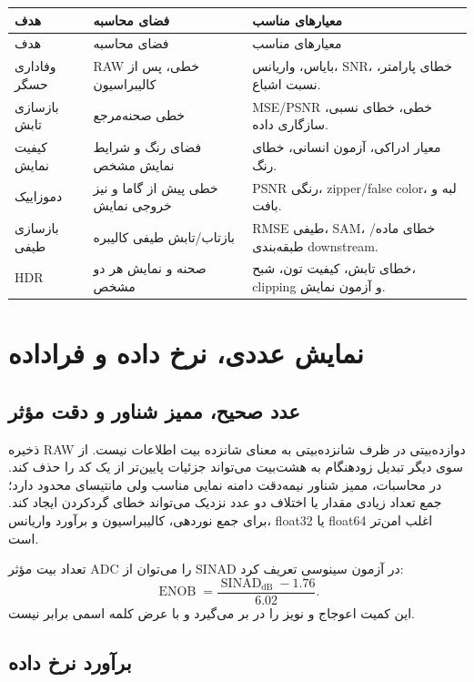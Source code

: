 \begin{longtable}{p{}p{}p{}}
\toprule
هدف & فضای محاسبه & معیارهای مناسب\\
\midrule
\endfirsthead
\toprule
هدف & فضای محاسبه & معیارهای مناسب\\
\midrule
\endhead
وفاداری حسگر & RAW خطی، پس از کالیبراسیون & بایاس، واریانس، SNR، خطای پارامتر، نسبت اشباع.\\
بازسازی تابش & خطی صحنه‌مرجع & MSE/PSNR خطی، خطای نسبی، سازگاری داده.\\
کیفیت نمایش & فضای رنگ و شرایط نمایش مشخص & معیار ادراکی، آزمون انسانی، خطای رنگ.\\
دموزاییک & خطی پیش از گاما و نیز خروجی نمایش & PSNR رنگی، zipper/false color، لبه و بافت.\\
بازسازی طیفی & بازتاب/تابش طیفی کالیبره & RMSE طیفی، SAM، خطای ماده/طبقه‌بندی downstream.\\
HDR & صحنه و نمایش هر دو مشخص & خطای تابش، کیفیت تون، شبح، clipping و آزمون نمایش.\\
\bottomrule
\end{longtable}


\section{نمایش عددی، نرخ داده و فراداده}

\subsection{عدد صحیح، ممیز شناور و دقت مؤثر}

ذخیره RAW دوازده‌بیتی در ظرف شانزده‌بیتی به معنای شانزده بیت اطلاعات نیست. از سوی دیگر تبدیل زودهنگام
به هشت‌بیت می‌تواند جزئیات پایین‌تر از یک کد را حذف کند. در محاسبات، ممیز شناور نیمه‌دقت
 دامنه نمایی مناسب ولی مانتیسای محدود دارد؛ جمع تعداد زیادی مقدار یا اختلاف دو عدد نزدیک
می‌تواند خطای گردکردن ایجاد کند. برای جمع نوردهی، کالیبراسیون و برآورد واریانس، float32 یا float64
اغلب امن‌تر است.

تعداد بیت مؤثر ADC را می‌توان از SINAD در آزمون سینوسی تعریف کرد:
\begin{equation}
\operatorname{ENOB}=\frac{\operatorname{SINAD}_{\mathrm{dB}}-1.76}{6.02}.
\end{equation}
این کمیت اعوجاج و نویز را در بر می‌گیرد و با عرض کلمه اسمی برابر نیست.

\subsection{برآورد نرخ داده}

